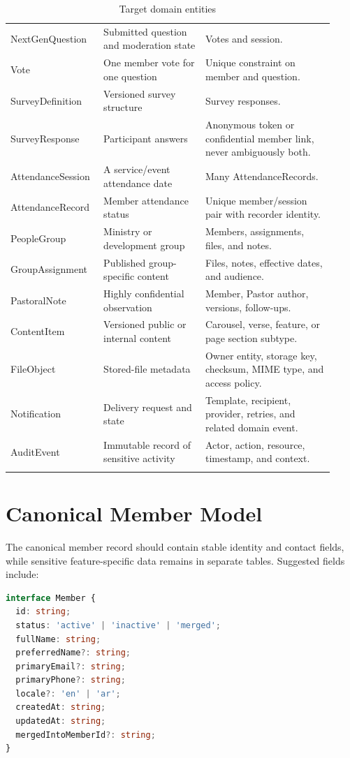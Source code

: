 \documentclass[11pt,a4paper,oneside]{report}
\begin{document}
\begin{longtable}{@{}p{0.24\linewidth} p{0.30\linewidth} p{0.38\linewidth}@{}}
NextGenQuestion & Submitted question and moderation state & Votes and session. \\
Vote & One member vote for one question & Unique constraint on member and question. \\
SurveyDefinition & Versioned survey structure & Survey responses. \\
SurveyResponse & Participant answers & Anonymous token or confidential member link, never ambiguously both. \\
AttendanceSession & A service/event attendance date & Many AttendanceRecords. \\
AttendanceRecord & Member attendance status & Unique member/session pair with recorder identity. \\
PeopleGroup & Ministry or development group & Members, assignments, files, and notes. \\
GroupAssignment & Published group-specific content & Files, notes, effective dates, and audience. \\
PastoralNote & Highly confidential observation & Member, Pastor author, versions, follow-ups. \\
ContentItem & Versioned public or internal content & Carousel, verse, feature, or page section subtype. \\
FileObject & Stored-file metadata & Owner entity, storage key, checksum, MIME type, and access policy. \\
Notification & Delivery request and state & Template, recipient, provider, retries, and related domain event. \\
AuditEvent & Immutable record of sensitive activity & Actor, action, resource, timestamp, and context. \\
\bottomrule
\caption{Target domain entities}
\end{longtable}

\section{Canonical Member Model}

The canonical member record should contain stable identity and contact fields, while sensitive feature-specific data remains in separate tables. Suggested fields include:

\begin{lstlisting}[language=TypeScript,caption={Conceptual member model}]
interface Member {
  id: string;
  status: 'active' | 'inactive' | 'merged';
  fullName: string;
  preferredName?: string;
  primaryEmail?: string;
  primaryPhone?: string;
  locale?: 'en' | 'ar';
  createdAt: string;
  updatedAt: string;
  mergedIntoMemberId?: string;
}
\end{lstlisting}
\end{document}
